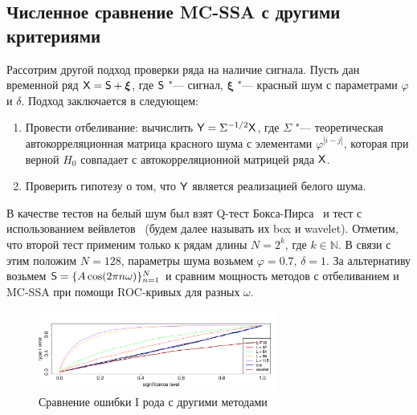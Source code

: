 \documentclass[specialist,
substylefile = spbu_report.rtx,
subf,href,colorlinks=true, 12pt]{disser}
\theoremstyle{definition}
\newcommand{\bfxi}{\boldsymbol{\xi}}
\begin{document}
\subsection{Численное сравнение MC-SSA с другими критериями}\label{sect:mc-ssa_comparison}
Рассотрим другой подход проверки ряда на наличие сигнала. Пусть дан временной ряд $\tX=\tS+\bfxi$, где $\mathsf{S}$ "--- сигнал, $\bfxi$ "--- красный шум с параметрами $\varphi$ и $\delta$. Подход заключается в следующем:
\begin{enumerate}
	\item Провести отбеливание: вычислить $\mathsf{Y}=\Sigma^{-1/2}\mathsf{X}$, где $\Sigma$ "--- теоретическая автокорреляционная матрица красного шума с элементами $\varphi^{|i-j|}$, которая при верной $H_0$ совпадает с автокорреляционной матрицей ряда $\mathsf{X}$.
	\item Проверить гипотезу о том, что $\mathsf{Y}$ является реализацией белого шума.
\end{enumerate} 
В качестве тестов на белый шум был взят Q-тест Бокса-Пирса~\cite{box-pierce} и тест с использованием вейвлетов~\cite{wavelet} (будем далее называть их box и wavelet). Отметим, что второй тест применим только к рядам длины $N=2^k$, где $k\in\mathbb{N}$. В связи с этим положим $N=128$, параметры шума возьмем $\varphi=0.7$, $\delta=1$. За альтернативу возьмем $\mathsf{S}=\{A\cos(2\pi n\omega)\}_{n=1}^N$ и сравним мощность методов с отбеливанием и MC-SSA при помощи ROC-кривых для разных $\omega$.

\begin{figure}[h!]
	\centering
	\includegraphics[width=0.7\textwidth]{img/alphaI_testAR.pdf}
	\caption{Сравнение ошибки I рода с другими методами}
	\label{alphaI_testAR}
\end{figure}
\end{document}
